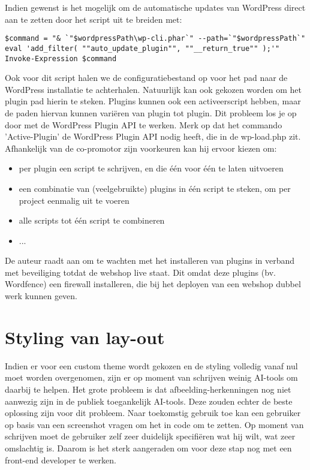 Indien gewenst is het mogelijk om de automatische updates van WordPress direct aan te zetten door het script uit te breiden met:
\begin{verbatim}
$command = "& `"$wordpressPath\wp-cli.phar`" --path=`"$wordpressPath`" eval 'add_filter( ""auto_update_plugin"", ""__return_true"" );'"
Invoke-Expression $command
\end{verbatim}
Ook voor dit script halen we de configuratiebestand op voor het pad naar de WordPress installatie te achterhalen. Natuurlijk kan ook gekozen worden om het plugin pad hierin te steken. Plugins kunnen ook een activeerscript hebben, maar de paden hiervan kunnen variëren van plugin tot plugin. Dit probleem los je op door met de WordPress Plugin API te werken. Merk op dat het commando 'Active-Plugin' de WordPress Plugin API nodig heeft, die in de wp-load.php zit. Afhankelijk van de co-promotor zijn voorkeuren kan hij ervoor kiezen om:
\begin{itemize}
    \item per plugin een script te schrijven, en die één voor één te laten uitvoeren
    \item een combinatie van (veelgebruikte) plugins in één script te steken, om per project eenmalig uit te voeren
    \item alle scripts tot één script te combineren
    \item ...
\end{itemize} 
De auteur raadt aan om te wachten met het installeren van plugins in verband met beveiliging totdat de webshop live staat. Dit omdat deze plugins (bv. Wordfence) een firewall installeren, die bij het deployen van een webshop dubbel werk kunnen geven.
\section{Styling van lay-out}
Indien er voor een custom theme wordt gekozen en de styling volledig vanaf nul moet worden overgenomen, zijn er op moment van schrijven weinig AI-tools om daarbij te helpen. Het grote probleem is dat afbeelding-herkenningen nog niet aanwezig zijn in de publiek toegankelijk AI-tools. Deze zouden echter de beste oplossing zijn voor dit probleem. Naar toekomstig gebruik toe kan een gebruiker op basis van een screenshot vragen om het in code om te zetten. Op moment van schrijven moet de gebruiker zelf zeer duidelijk specifiëren wat hij wilt, wat zeer omslachtig is. Daarom is het sterk aangeraden om voor deze stap nog met een front-end developer te werken.

